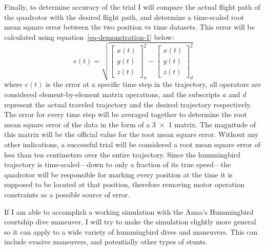 \documentclass[onecolumn,10pt]{IEEEtran}
\begin{document}
Finally, to determine accuracy of the trial I will compare the actual flight path of the quadrotor with the desired flight path, and determine a time-scaled root mean square error between the two position vs time datasets. This error will be calculated using equation~\ref{eq-demonstration-1} below:
\begin{equation}
e(t) = \sqrt{
\begin{bmatrix}
x(t) \\ y(t) \\ z(t)
\end{bmatrix}_a^2 
-
\begin{bmatrix}
x(t) \\ y(t) \\ z(t)
\end{bmatrix}_d^2
}
\label{eq-demonstration-1}
\end{equation}
where $e(t)$ is the error at a specific time step in the trajectory, all operators are considered element-by-element matrix operations, and the subscripts $a$ and $d$ represent the actual traveled trajectory and the desired trajectory respectively. The error for every time step will be averaged together to determine the root mean square error of the data in the form of a \num{3x1} matrix. The magnitude of this matrix will be the official value for the root mean square error. Without any other indications, a successful trial will be considered a root mean square error of less than ten centimeters over the entire trajectory. Since the hummingbird trajectory is time-scaled—down to only a fraction of its true speed—the quadrotor will be responsible for marking every position at the time it is supposed to be located at that position, therefore removing motor operation constraints as a possible source of error.

If I am able to accomplish a working simulation with the Anna’s Hummingbird courtship dive maneuver, I will try to make the simulation slightly more general so it can apply to a wide variety of hummingbird dives and maneuvers. This can include evasive maneuvers, and potentially other types of stunts.
\end{document}
